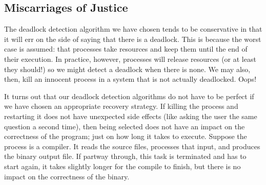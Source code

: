 \subsection*{Miscarriages of Justice}
The deadlock detection algorithm we have chosen tends to be conservative in that it will err on the side of saying that there is a deadlock. This is because the worst case is assumed: that processes take resources and keep them until the end of their execution. In practice, however, processes will release resources (or at least they should!) so we might detect a deadlock when there is none. We may also, then, kill an innocent process in a system that is not actually deadlocked. Oops!

It turns out that our deadlock detection algorithms do not have to be perfect if we have chosen an appropriate recovery strategy. If killing the process and restarting it does not have unexpected side effects (like asking the user the same question a second time), then being selected does not have an impact on the correctness of the program; just on how long it takes to execute. Suppose the process is a compiler. It reads the source files, processes that input, and produces the binary output file. If partway through, this task is terminated and has to start again, it takes slightly longer for the compile to finish, but there is no impact on the correctness of the binary.




